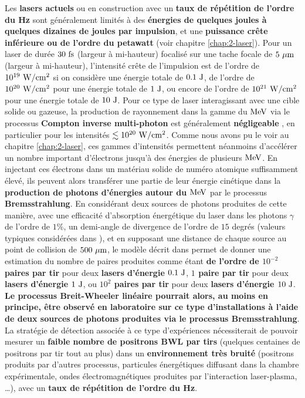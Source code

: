 \begin{refsection}
Les \textbf{lasers actuels} ou en construction avec un \textbf{taux de répétition de l'ordre du Hz} sont généralement limités à des \textbf{énergies de quelques joules à quelques dizaines de joules par impulsion}, et une \textbf{puissance crête inférieure ou de l'ordre du petawatt} (voir chapitre \ref{chap:2-laser}). Pour un laser de durée $30 ~ \rm fs$ (largeur à mi-hauteur) focalisé sur une tache focale de $5 ~ \rm \mu m$ (largeur à mi-hauteur), l'intensité crête de l'impulsion est de l'ordre de $10^{19} ~ \rm W/cm^2$ si on considère une énergie totale de $0.1 ~ \rm J$, de l'ordre de $10^{20} ~ \rm W/cm^2$ pour une énergie totale de $1 ~ \rm J$, ou encore de l'ordre de $10^{21} ~ \rm W/cm^2$ pour une énergie totale de $10 ~ \rm J$. Pour ce type de laser interagissant avec une cible solide ou gazeuse, la production de rayonnement dans la gamme du $\rm MeV$ via le processus \textbf{Compton inverse multi-photon} est généralement \textbf{négligeable} \parencite{ji_2014}, en particulier pour les intensités $\lesssim 10^{20} ~ \rm W/cm^2$. Comme nous avons pu le voir au chapitre \ref{chap:2-laser}, ces gammes d'intensités permettent néanmoins d'accélérer un nombre important d'électrons jusqu'à des énergies de plusieurs $\rm MeV$. En injectant ces électrons dans un matériau solide de numéro atomique suffisamment élevé, ils peuvent alors transférer une partie de leur énergie cinétique dans la \textbf{production de photons d'énergies autour du $\rm MeV$} par le processus \textbf{Bremsstrahlung}. En considérant deux sources de photons produites de cette manière, avec une efficacité d'absorption énergétique du laser dans les photons $\gamma$ de l'ordre de $1 \%$, un demi-angle de divergence de l'ordre de $15$ degrés (valeurs typiques considérées dans \parencite{ribeyre_2016}), et en supposant une distance de chaque source au point de collision de $500 ~ \rm \mu m$, le modèle décrit dans \cite{ribeyre_2016} permet de donner une estimation du nombre de paires produites comme étant \textbf{de l'ordre de $10^{-2}$ paires par tir} pour deux \textbf{lasers d'énergie $0.1 ~ \rm J$}, \textbf{$1$ paire par tir} pour deux \textbf{lasers d'énergie $1 ~ \rm J$}, ou \textbf{$10^2$ paires par tir} pour deux \textbf{lasers d'énergie $10 ~ \rm J$}. \textbf{Le processus Breit-Wheeler linéaire pourrait alors, au moins en principe, être observé en laboratoire sur ce type d'installations à l'aide de deux sources de photons produites via le processus Bremsstrahlung}. La stratégie de détection associée à ce type d'expériences nécessiterait de pouvoir mesurer un \textbf{faible nombre de positrons BWL par tirs} (quelques centaines de positrons par tir tout au plus) dans un \textbf{environnement très bruité} (positrons produits par d'autres processus, particules énergétiques diffusant dans la chambre expérimentale, ondes électromagnétiques produites par l'interaction laser-plasma, …), avec un \textbf{taux de répétition de l'ordre du Hz}.


\end{refsection}

